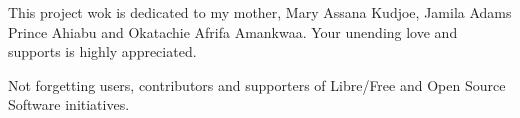 
\begin{dedication} %
{}
This project wok is dedicated to my mother, Mary Assana Kudjoe, Jamila Adams Prince Ahiabu and Okatachie Afrifa Amankwaa. Your unending love and supports is highly appreciated.

Not forgetting users, contributors and supporters of Libre/Free and Open Source Software initiatives.

\end{dedication}

